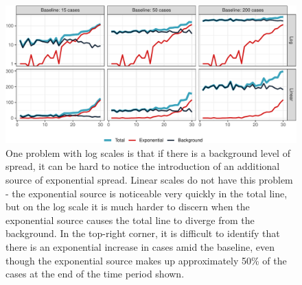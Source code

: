 \documentclass[article]{jdssv}\usepackage[]{graphicx}\usepackage[]{xcolor}
\newenvironment{knitrout}{}{} %
\begin{document}
\begin{knitrout}\footnotesize
{}\color{fgcolor}\begin{figure}

{\centering \includegraphics[width=.95\linewidth]{Figures_R/fig-log-scale-failures-1} 

}

\caption[One problem with log scales is that if there is a background level of spread, it can be hard to notice the introduction of an additional source of exponential spread]{One problem with log scales is that if there is a background level of spread, it can be hard to notice the introduction of an additional source of exponential spread. Linear scales do not have this problem - the exponential source is noticeable very quickly in the total line, but on the log scale it is much harder to discern when the exponential source causes the total line to diverge from the background. In the top-right corner, it is difficult to identify that there is an exponential increase in cases amid the baseline, even though the exponential source makes up approximately 50\% of the cases at the end of the time period shown.}\label{fig:log-scale-failures}
\end{figure}

\end{knitrout}

\end{document}
